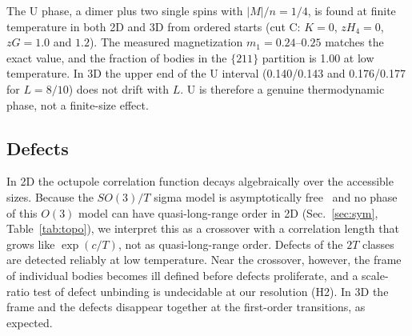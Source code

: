 \documentclass[pre,twocolumn,superscriptaddress,amsmath,amssymb,floatfix]{revtex4-2}
\begin{document}
The U phase, a dimer plus two single spins with $|M|/n=1/4$, is found at finite temperature in both 2D and 3D from ordered starts (cut C: $K=0$, $zH_4=0$, $zG=1.0$ and $1.2$). The measured magnetization $m_1=0.24$--$0.25$ matches the exact value, and the fraction of bodies in the $\{211\}$ partition is 1.00 at low temperature. In 3D the upper end of the U interval (0.140/0.143 and 0.176/0.177 for $L=8/10$) does not drift with $L$. U is therefore a genuine thermodynamic phase, not a finite-size effect.

\subsection{Defects}

In 2D the octupole correlation function decays algebraically over the accessible sizes. Because the $SO(3)/T$ sigma model is asymptotically free~\cite{Polyakov1975} and no phase of this $O(3)$ model can have quasi-long-range order in 2D (Sec.~\ref{sec:sym}, Table~\ref{tab:topo}), we interpret this as a crossover with a correlation length that grows like $\exp(c/T)$, not as quasi-long-range order. Defects of the $2T$ classes are detected reliably at low temperature. Near the crossover, however, the frame of individual bodies becomes ill defined before defects proliferate, and a scale-ratio test of defect unbinding is undecidable at our resolution (H2). In 3D the frame and the defects disappear together at the first-order transitions, as expected.
\end{document}
